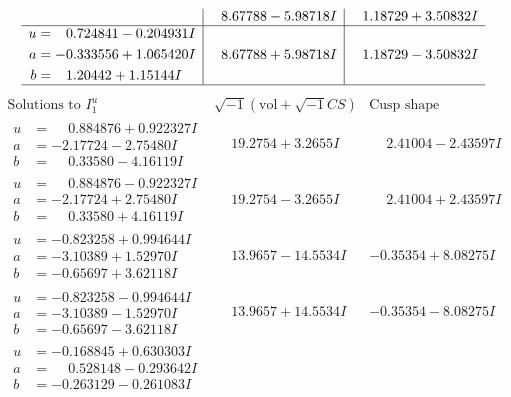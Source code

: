 \documentclass[1p]{elsarticle_modified}
\theoremstyle{definition}
\newcommand{\I}{\sqrt{-1}}
\begin{document}
$$\begin{array}{c|c|c}
 & \phantom{-}8.67788 - 5.98718 I & \phantom{-}1.18729 + 3.50832 I \\ \hline\begin{aligned}
u &= \phantom{-}0.724841 - 0.204931 I \\
a &= -0.333556 + 1.065420 I \\
b &= \phantom{-}1.20442 + 1.15144 I\end{aligned}
 & \phantom{-}8.67788 + 5.98718 I & \phantom{-}1.18729 - 3.50832 I\\
 \hline 
 \end{array}$$\newpage$$\begin{array}{c|c|c}  
\text{Solutions to }I^u_{1}& \I (\text{vol} + \sqrt{-1}CS) & \text{Cusp shape}\\
 \hline 
\begin{aligned}
u &= \phantom{-}0.884876 + 0.922327 I \\
a &= -2.17724 - 2.75480 I \\
b &= \phantom{-}0.33580 - 4.16119 I\end{aligned}
 & \phantom{-}19.2754 + 3.2655 I & \phantom{-}2.41004 - 2.43597 I \\ \hline\begin{aligned}
u &= \phantom{-}0.884876 - 0.922327 I \\
a &= -2.17724 + 2.75480 I \\
b &= \phantom{-}0.33580 + 4.16119 I\end{aligned}
 & \phantom{-}19.2754 - 3.2655 I & \phantom{-}2.41004 + 2.43597 I \\ \hline\begin{aligned}
u &= -0.823258 + 0.994644 I \\
a &= -3.10389 + 1.52970 I \\
b &= -0.65697 + 3.62118 I\end{aligned}
 & \phantom{-}13.9657 - 14.5534 I & -0.35354 + 8.08275 I \\ \hline\begin{aligned}
u &= -0.823258 - 0.994644 I \\
a &= -3.10389 - 1.52970 I \\
b &= -0.65697 - 3.62118 I\end{aligned}
 & \phantom{-}13.9657 + 14.5534 I & -0.35354 - 8.08275 I \\ \hline\begin{aligned}
u &= -0.168845 + 0.630303 I \\
a &= \phantom{-}0.528148 - 0.293642 I \\
b &= -0.263129 - 0.261083 I\end{aligned}

\end{array}$$
\end{document}
